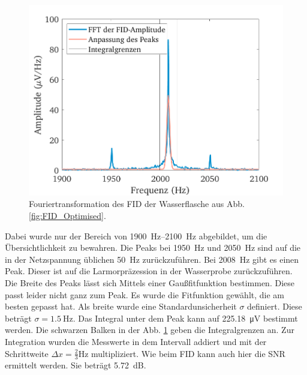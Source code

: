 \documentclass[../main.tex]{subfiles}
\begin{document}
    \begin{figure}[h!]
        \centering
        \includegraphics[width=\textwidth]{Bilddateien/7/Part7_Fig_2.png}
        \caption{Fouriertransformation des FID der Wasserflasche aus Abb. \ref{fig:FID_Optimised}.}
        \label{fig:FID_Optimised_FFT}
    \end{figure}
    Dabei wurde nur der Bereich von \SIrange{1900}{2100}{\hertz} abgebildet, um die Übersichtlichkeit zu bewahren. Die Peaks bei \SI{1950}{\hertz} und \SI{2050}{\hertz} sind auf die in der Netzspannung üblichen \SI{50}{\hertz} zurückzuführen. Bei \SI{2008}{\hertz} gibt es einen Peak. Dieser ist auf die Larmorpräzession in der Wasserprobe zurückzuführen. Die Breite des Peaks lässt sich Mittels einer Gaußfitfunktion bestimmen. Diese passt leider nicht ganz zum Peak. Es wurde die Fitfunktion gewählt, die am besten gepasst hat. Als breite wurde eine Standardunsicherheit $\sigma$ definiert. Diese beträgt $\sigma = \SI{1,5}{\hertz}$. Das Integral unter dem Peak kann auf \SI{225,18}{\micro \volt} bestimmt werden. Die schwarzen Balken in der Abb. \ref{fig:FID_Optimised_FFT} geben die Integralgrenzen an. Zur Integration wurden die Messwerte in dem Intervall addiert und mit der Schrittweite $\Delta x = \frac{2}{3}\si{\hertz}$ multipliziert. Wie beim FID kann auch hier die SNR ermittelt werden. Sie beträgt \SI{5,72}{\deci \bel}.
\end{document}
